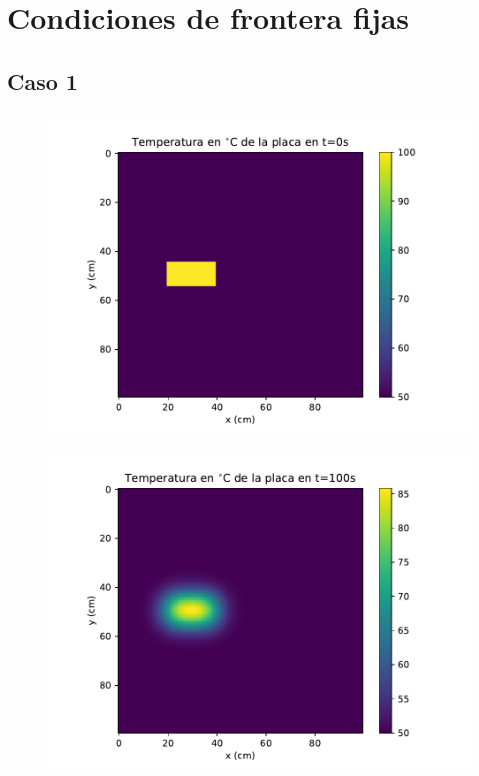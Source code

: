 \documentclass[12pt,letterpaper]{article}
\begin{document}
\section*{Condiciones de frontera fijas}

\subsection*{Caso 1}

\begin{figure}[H]
\includegraphics{f1_0.pdf}
\centering
\end{figure}

\begin{figure}[H]
\includegraphics{f1_100.pdf}
\centering
\end{figure}
\end{document}
